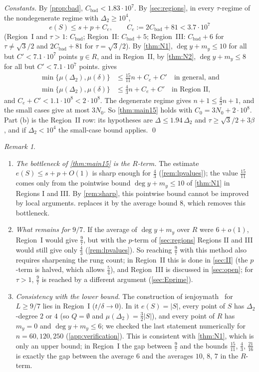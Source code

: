 \documentclass[11pt]{amsart}
\theoremstyle{definition}
\theoremstyle{remark}
\newtheorem{remark}[theorem]{Remark}
\newcommand{\Dt}{\Delta_2}
\newcommand{\mult}{\mu}
\begin{document}
\emph{Constants.} By \cref{prop:bad}, $C_{\mathrm{bad}}<1.83\cdot10^7$. By \cref{sec:regions}, in every $\tau$-regime of the nondegenerate regime with $\Dt\ge10^4$,
\[
e(S)\le s+p+C_e,\qquad C_e:=2C_{\mathrm{bad}}+81<3.7\cdot10^7
\]
(Region~I and $\tau>1$: $C_{\mathrm{bad}}$; Region~II: $C_{\mathrm{bad}}+5$; Region~III: $C_{\mathrm{bad}}+6$ for $\tau\neq\sqrt3/2$ and $2C_{\mathrm{bad}}+81$ for $\tau=\sqrt3/2$). By \cref{thm:N1}, $\deg y+m_y\le10$ for all but $C'<7.1\cdot10^7$ points $y\in R$, and in Region~II, by \cref{thm:N2}, $\deg y+m_y\le 8$ for all but $C'<7.1\cdot10^7$ points.  gives
\begin{align*}
\min\{\mult(\Dt),\mult(\delta)\}&\le\tfrac{15}{11}n+C_e+C'\quad\text{in general, and}\\
\min\{\mult(\Dt),\mult(\delta)\}&\le\tfrac43n+C_e+C'\quad\text{in Region II,}
\end{align*}
and $C_e+C'<1.1\cdot10^8<2\cdot10^8$. The degenerate regime gives $n+1\le\frac43n+1$, and the small cases give at most $3N_0$. So \cref{thm:main15} holds with $C_0=3N_0+2\cdot10^8$. Part (b) is the Region~II row: its hypotheses are $\Delta\le1.94\,\Dt$ and $\tau\ge\sqrt3/2+3\beta$, and if $\Dt<10^4$ the small-case bound applies. \qed

\begin{remark}\label{rem:bottleneck}
\begin{enumerate}[leftmargin=2em,label=(\alph*)]
\item \emph{The bottleneck of \cref{thm:main15} is the $R$-term.} The estimate $e(S)\le s+p+O(1)$ is sharp enough for $\frac43$ (\cref{rem:lpvalues}); the value $\frac{15}{11}$ comes only from the pointwise bound $\deg y+m_y\le10$ of \cref{thm:N1} in Regions I and III. By \cref{rem:sharp}, this pointwise bound cannot be improved by local arguments.  replaces it by the average bound $8$, which removes this bottleneck.
\item \emph{What remains for $9/7$.} If the average of $\deg y+m_y$ over $R$ were $6+o(1)$, Region~I would give $\frac97$, but with the $p$-term of \cref{sec:regions} Regions II and III would still give only $\frac43$ (\cref{rem:lpvalues}). So reaching $\frac97$ with this method also requires sharpening the rung count; in Region~II this is done in \cref{sec:II} (the $p$-term is halved, which allows $\frac54$), and Region~III is discussed in \cref{sec:open}; for $\tau>1$, $\frac97$ is reached by a different argument (\cref{sec:Eprime}).
\item \emph{Consistency with the lower bound.} The construction of ienjoymath~\cite{ienjoymath} for $L\ge9/7$ lies in Region~I ($t/\delta\to0$). In it $e(S)=|S|$, every point of $S$ has $\Dt$-degree $2$ or $4$ (so $Q=\emptyset$ and $\mult(\Dt)=\frac32|S|$), and every point of $R$ has $m_y=0$ and $\deg y+m_y\le6$; we checked the last statement numerically for $n=60,120,250$ (\cref{app:verification}). This is consistent with \cref{thm:N1}, which is only an upper bound; in Region~I the gap between $\frac97$ and the bounds $\frac{15}{11}$, $\frac43$, $\frac{21}{16}$ is exactly the gap between the average $6$ and the averages $10$, $8$, $7$ in the $R$-term.
\end{enumerate}
\end{remark}
\end{document}
